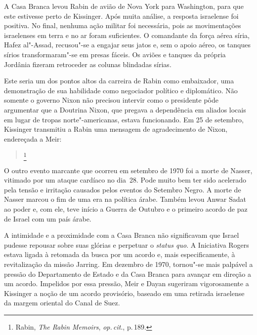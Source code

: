 A Casa Branca levou Rabin de avião de Nova York para Washington, para
que este estivesse perto de Kissinger. Após muita análise, a resposta
israelense foi positiva. No final, nenhuma ação militar foi necessária,
pois as movimentações israelenses em terra e no ar foram suficientes. O
comandante da força aérea síria, Hafez al"-Assad, recusou"-se a engajar
seus jatos e, sem o apoio aéreo, os tanques sírios transformaram"-se em
presas fáceis. Os aviões e tanques da própria Jordânia fizeram
retroceder as colunas blindadas sírias.

Este seria um dos pontos altos da carreira de Rabin como embaixador, uma
demonstração de sua habilidade como negociador político e diplomático.
Não somente o governo Nixon não precisou intervir como o presidente pôde
argumentar que a Doutrina Nixon, que pregava a dependência em aliados
locais em lugar de tropas norte"-americanas, estava funcionando. Em 25 de
setembro, Kissinger transmitiu a Rabin uma mensagem de agradecimento de
Nixon, endereçada a Meir:

\begin{quote}
\footnote{Rabin, \textit{The Rabin Memoirs}, \textit{op.\,cit}., p.\,189.}
\end{quote}


O outro evento marcante que ocorreu em setembro de 1970 foi a morte de
Nasser, vitimado por um ataque cardíaco no dia~28. Pode muito bem ter
sido acelerado pela tensão e irritação causados pelos eventos do
Setembro Negro. A morte de Nasser marcou o fim de uma era na política
árabe. Também levou Anwar Sadat ao poder e, com ele, teve início a Guerra de Outubro e
o primeiro acordo de paz de Israel com um país árabe.

A intimidade e a proximidade com a Casa Branca não significavam que
Israel pudesse repousar sobre suas glórias e perpetuar o \textit{status
quo}. A Iniciativa Rogers estava ligada à retomada da busca por um
acordo e, mais especificamente, à revitalização da missão Jarring. Em
dezembro de 1970, tornou"-se mais palpável a pressão do Departamento de
Estado e da Casa Branca para avançar em direção a um acordo. Impelidos
por essa pressão, Meir e Dayan sugeriram vigorosamente a Kissinger a
noção de um acordo provisório, baseado em uma retirada israelense da
margem oriental do Canal de Suez.

